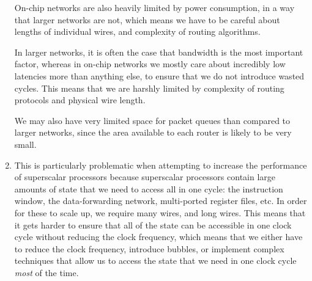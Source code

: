 \begin{enumerate}[label=(\alph*)]
    On-chip networks are also heavily limited by power consumption, in a way that larger networks are not, which means we have to be careful about lengths of individual wires, and complexity of routing algorithms.

    In larger networks, it is often the case that bandwidth is the most important factor, whereas in on-chip networks we mostly care about incredibly low latencies more than anything else, to ensure that we do not introduce wasted cycles. This means that we are harshly limited by complexity of routing protocols and physical wire length.

    We may also have very limited space for packet queues than compared to larger networks, since the area available to each router is likely to be very small.

  \item
    This is particularly problematic when attempting to increase the performance of superscalar processors because superscalar processors contain large amounts of state that we need to access all in one cycle: the instruction window, the data-forwarding network, multi-ported register files, etc. In order for these to scale up, we require many wires, and long wires. This means that it gets harder to ensure that all of the state can be accessible in one clock cycle without reducing the clock frequency, which means that we either have to reduce the clock frequency, introduce bubbles, or implement complex techniques that allow us to access the state that we need in one clock cycle \textit{most} of the time.


        
\end{enumerate}

